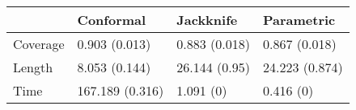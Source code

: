 \begin{tabular}{|l|l|l|l|}
\hline
& Conformal & Jackknife & Parametric \\
\hline
Coverage & 0.903 (0.013) & 0.883 (0.018) & 0.867 (0.018) \\
\hline
Length & 8.053 (0.144) & 26.144 (0.95) & 24.223 (0.874) \\
\hline
Time & 167.189 (0.316) & 1.091 (0) & 0.416 (0) \\
\hline
\end{tabular}
